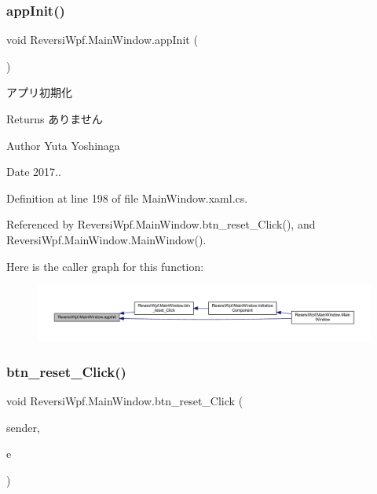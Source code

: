\subsubsection{\texorpdfstring{app\+Init()}{appInit()}}
{\footnotesize\ttfamily void Reversi\+Wpf.\+Main\+Window.\+app\+Init (\begin{DoxyParamCaption}{ }\end{DoxyParamCaption})}



アプリ初期化 

\begin{DoxyReturn}{Returns}
ありません 
\end{DoxyReturn}
\begin{DoxyAuthor}{Author}
Yuta Yoshinaga 
\end{DoxyAuthor}
\begin{DoxyDate}{Date}
2017.. 
\end{DoxyDate}


Definition at line 198 of file Main\+Window.\+xaml.\+cs.



Referenced by Reversi\+Wpf.\+Main\+Window.\+btn\+\_\+reset\+\_\+\+Click(), and Reversi\+Wpf.\+Main\+Window.\+Main\+Window().

Here is the caller graph for this function\+:\nopagebreak
\begin{figure}[H]
\begin{center}
\leavevmode
\includegraphics[width=350pt]{class_reversi_wpf_1_1_main_window_a4e9c1014738c9b72f093dbc179ce984e_icgraph}
\end{center}
\end{figure}
\mbox{\label{class_reversi_wpf_1_1_main_window_a9b7c6af889d570bc68dcd2cf981e4cf8}} 
\subsubsection{\texorpdfstring{btn\+\_\+reset\+\_\+\+Click()}{btn\_reset\_Click()}}
{\footnotesize\ttfamily void Reversi\+Wpf.\+Main\+Window.\+btn\+\_\+reset\+\_\+\+Click (\begin{DoxyParamCaption}\item[{object}]{sender,  }\item[{Routed\+Event\+Args}]{e }\end{DoxyParamCaption})\hspace{0.3cm}{\ttfamily [private]}}



